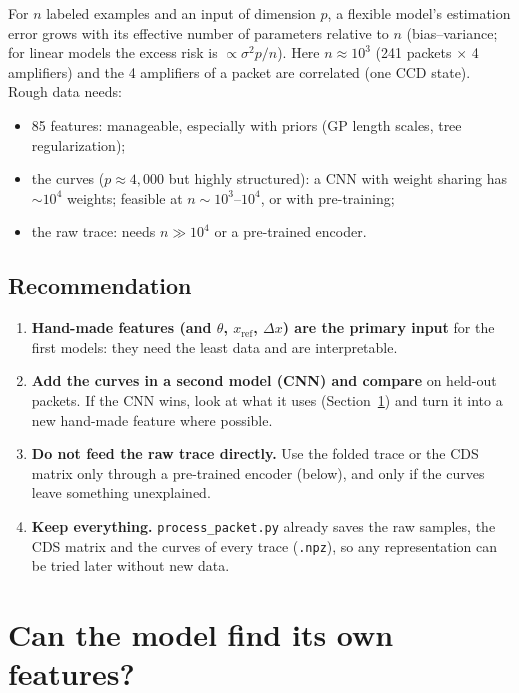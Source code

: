 \documentclass[10pt]{article}
\newcommand{\code}[1]{\texttt{#1}}
\begin{document}
\begin{advanced}
For $n$ labeled examples and an input of dimension $p$, a flexible model's estimation error grows with its effective number of
parameters relative to $n$ (bias--variance; for linear models the excess risk is $\propto \sigma^2 p / n$). Here
$n \approx 10^3$ (241 packets $\times$ 4 amplifiers) and the 4 amplifiers of a packet are correlated (one CCD state). Rough data needs:
\begin{itemize}
\item 85 features: manageable, especially with priors (GP length scales, tree regularization);
\item the curves ($p \approx 4{,}000$ but highly structured): a CNN with weight sharing has $\sim 10^4$ weights; feasible at
  $n \sim 10^3$--$10^4$, or with pre-training;
\item the raw trace: needs $n \gg 10^4$ or a pre-trained encoder.
\end{itemize}
\end{advanced}

\subsection{Recommendation}
\begin{enumerate}
\item \textbf{Hand-made features (and $\theta$, $x_\text{ref}$, $\Delta x$) are the primary input} for the first models: they need
  the least data and are interpretable.
\item \textbf{Add the curves in a second model (CNN) and compare} on held-out packets. If the CNN wins, look at what it uses
  (Section~\ref{sec:own}) and turn it into a new hand-made feature where possible.
\item \textbf{Do not feed the raw trace directly.} Use the folded trace or the CDS matrix only through a pre-trained encoder (below),
  and only if the curves leave something unexplained.
\item \textbf{Keep everything.} \code{process\_packet.py} already saves the raw samples, the CDS matrix and the curves of every trace
  (\code{.npz}), so any representation can be tried later without new data.
\end{enumerate}

\section{Can the model find its own features?}
\label{sec:own}
\end{document}
